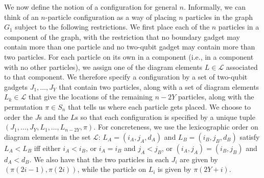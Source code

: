 \documentclass[../thesis-main/thesis-main]{subfiles}
\begin{document}
We now define the notion of a configuration for general $n$. Informally, we can think of an $n$-particle configuration as a way of placing $n$ particles in the graph $G_{1}$ subject to the following restrictions. We first place each of the $n$ particles in a component of the graph, with the restriction that no boundary gadget may contain more than one particle and no two-qubit gadget may contain more than two particles. For each particle on its own in a component (i.e., in a component with no other particles), we assign one of the diagram elements $L\in\mathcal{L}$ associated to that component. We therefore specify a configuration by a set of two-qubit gadgets $J_{1},\ldots,J_{Y}$ that contain two particles, along with a set of diagram elements $L_{k}\in\mathcal{L}$ that give the locations of the remaining $n-2Y$ particles, along with the permutation $\pi\in S_n$ that tells us where each particle gets placed. We choose to order the $J$s and the $L$s so that each configuration is specified by a unique tuple $(J_{1},\ldots,J_{Y},L_{1},\ldots,L_{n-2Y},\pi)$. For concreteness, we use the lexicographic order on diagram elements in the set $\mathcal{L}$: $L_{A}=(i_{A},j_{A},d_{A})$ and $L_{B}=(i_{B},j_{B},d_{B})$ satisfy $L_{A}<L_{B}$ iff either $i_{A}<i_{B}$, or $i_{A}=i_{B}$ and $j_{A}<j_{B}$, or $(i_{A},j_{A})=(i_{B},j_{B})$ and $d_{A}<d_{B}$.  We also have that the two particles in each $J_i$ are given by $(\pi(2i-1),\pi(2i))$, while the particle on $L_i$ is given by $\pi(2Y+i)$.
\end{document}
